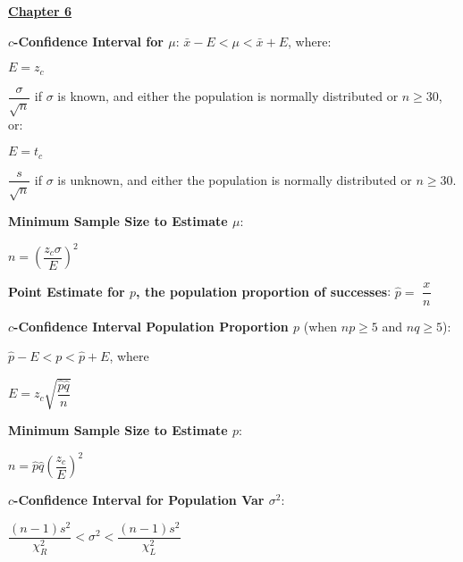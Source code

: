 \documentclass{article}
\begin{document}
\begin{large}
\vspace{0.25in}

\underline{\textbf{\huge Chapter 6 \phantom{ } \phantom{ } \phantom{ } \phantom{ }}}

\textbf{$c$-Confidence Interval for $\mu$}: $\bar{x} - E < \mu < \bar{x} + E$, where:

\hspace{0.1in} \begin{Large}$E = z_{c}$\end{Large}$\dfrac{\sigma}{\sqrt{n}}$ if $\sigma$ is known, and either the population is normally distributed or $n \geq 30$, or:

\hspace{0.1in} \begin{Large}$E = t_{c}$\end{Large}$\dfrac{s}{\sqrt{n}}$ if $\sigma$ is unknown, and either the population is normally distributed or $n \geq 30$.

\textbf{Minimum Sample Size to Estimate $\mu$}: 

\hspace{0.1in} \begin{Large}$n = \left(\dfrac{z_{c}\sigma}{E}\right)^{2}$\end{Large}

\textbf{Point Estimate for $p$, the population proportion of successes}: $\hat{p} =$ {\LARGE $ \dfrac{x}{n}$}

\textbf{$c$-Confidence Interval Population Proportion $p$} (when $np \geq 5$ and $nq \geq 5$): 

\hspace{0.1in} $\hat{p} - E < p < \hat{p} + E$, where \begin{Large}$E = z_{c}\sqrt{\dfrac{\hat{p}\hat{q}}{n}}$\end{Large}

\textbf{Minimum Sample Size to Estimate $p$}: 

\hspace{0.1in} \begin{Large}$n = \hat{p}\hat{q}\left(\dfrac{z_{c}}{E}\right)^{2}$\end{Large}

\textbf{$c$-Confidence Interval for Population Var $\sigma^{2}$}:

\hspace{0.1in} \begin{Large}$\dfrac{(n-1)s^{2}}{\chi_{R}^{2}} < \sigma^{2} < \dfrac{(n-1)s^{2}}{\chi_{L}^{2}}$\end{Large}


\end{large}
\end{document}
